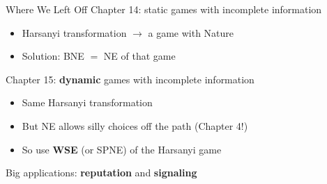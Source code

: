 \newcommand{\chainks}{%
\begin{tikzpicture}[x=1.5in, y=0.5in]
  \node at (0, 0.8) {$\alpha$: rational}; \node at (1, 0.8) {$\beta$: hotheaded};
  \foreach \y/\n/\c in {0/IKEA/player2, -1/Wayfair/player1, -2/Living Spaces/player3}
    {\node[anchor=east, text=\c] at (-0.3, \y) {\n:};
     \fill (0, \y) circle (2pt); \fill (1, \y) circle (2pt);}
  \foreach \y/\c in {0/player2, -1/player1}
    {\draw[\c, thick, rounded corners=7pt] (-0.15, \y-0.25) rectangle (0.15, \y+0.25);
     \draw[\c, thick, rounded corners=7pt] (0.85, \y-0.25) rectangle (1.15, \y+0.25);}
  \draw[player3, thick, rounded corners=7pt] (-0.15, -2.25) rectangle (1.15, -1.75);
  \node[anchor=west, font=\footnotesize] at (0.04, -2) {$1-p$};
  \node[anchor=west, font=\footnotesize] at (1.04, -2) {$p$};
  \draw[->, thick] (0, -2.9) -- (0, -2.4); \node[font=\scriptsize] at (0, -3.05) {true state};
\end{tikzpicture}}



\frame{\maketitle}

\begin{frame}{Where We Left Off}
Chapter 14: static games with incomplete information
\begin{itemize}
    \item Harsanyi transformation $\to$ a game with Nature
    \item Solution: BNE $=$ NE of that game
\end{itemize}
\bsk
Chapter 15: \textbf{dynamic} games with incomplete information
\begin{itemize}
    \item Same Harsanyi transformation
    \item But NE allows silly choices off the path (Chapter 4!)
    \item So use \textbf{WSE} (or SPNE) of the Harsanyi game
\end{itemize}
\bsk
Big applications: \textbf{reputation} and \textbf{signaling}
\vspace{-0.3in}
\end{frame}


